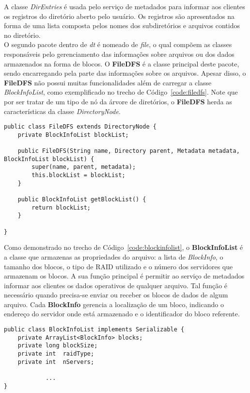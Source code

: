 A classe \textit{DirEntries} é usada pelo serviço de metadados para informar aos clientes os registros do diretório aberto pelo usuário. Os registros são apresentados na forma de uma lista composta pelos nomes dos subdiretórios e arquivos contidos no diretório. 
\\

O segundo pacote dentro de \textit{dt} é nomeado de \textit{file}, o qual compõem as classes responsáveis pelo gerenciamento das informações sobre arquivos ou dos dados armazenados na forma de blocos. 
O \textbf{FileDFS} é a classe principal deste pacote, sendo encarregando pela parte das informações sobre os arquivos. Apesar disso, o \textbf{FileDFS} não possui muitas funcionalidades além de carregar a classe \textit{BlockInfoList}, como exemplificado no trecho de Código~\ref{code:filedfs}. Note que por ser tratar de um tipo de nó da árvore de diretórios, o \textbf{FileDFS} herda as características da classe \textit{DirectoryNode}.
\\

\begin{lstlisting}[basicstyle=\ttfamily\footnotesize, frame=single, caption=Classe FileDFS, label=code:filedfs]
public class FileDFS extends DirectoryNode {
	private BlockInfoList blockList;
	
	public FileDFS(String name, Directory parent, Metadata metadata, BlockInfoList blockList) {
		super(name, parent, metadata);	
		this.blockList = blockList;
	}
	
	public BlockInfoList getBlockList() {
		return blockList;
	}
	
}
\end{lstlisting}

Como demonstrado no trecho de Código~\ref{code:blockinfolist}, o \textbf{BlockInfoList} é a classe que armazenas as propriedades do arquivo: a lista de \textit{BlockInfo}, o tamanho dos blocos, o tipo de RAID utilizado e o número dos servidores que armazenam os blocos.
A sua função principal é permitir ao serviço de metadados informar aos clientes os dados operativos de qualquer arquivo. Tal função é necessário quando precisa-se enviar ou receber os blocos de dados de algum arquivo. Cada \textbf{BlockInfo} gerencia a localização de um bloco, indicando o endereço do servidor onde está armazenado e o identificador do bloco referente.
\\

\begin{lstlisting}[basicstyle=\ttfamily\footnotesize, frame=single, caption=Declaração e os campos da classe BlockInfoList, label=code:blockinfolist]
public class BlockInfoList implements Serializable {
	private ArrayList<BlockInfo> blocks;
	private long blockSize;
	private int  raidType;
	private int  nServers;
 
			...
}
\end{lstlisting}

